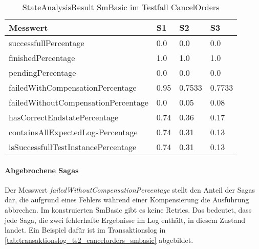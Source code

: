 \begin{center}
	\fontsize{9}{12}\selectfont
	\begin{longtable}[h]{|p{5cm}|p{1cm}|p{1cm}|p{1cm}|}
		\hline
		Messwert & S1 & S2 & S3 \\ \hline
		\endhead
		\caption{StateAnalysisResult SmBasic im Testfall CancelOrders}
		\label{tab:smbasic_stateanalysisresult_cancelorders}
		\endfoot
		successfull\-Percentage & 0.0 & 0.0 & 0.0 \\ \hline
		finished\-Percentage & 1.0 & 1.0 & 1.0 \\ \hline
		pending\-Percentage & 0.0 & 0.0 & 0.0 \\ \hline
		failedWithCompensation\-Percentage & 0.95 & 0.7533 & 0.7733 \\ \hline
		failedWithoutCompensation\-Percentage & 0.0 & 0.05 & 0.08 \\ \hline
		hasCorrectEndstate\-Percentage & 0.74 & 0.36 & 0.17 \\ \hline
		containsAllExpectedLogs\-Percentage & 0.74 & 0.31 & 0.13 \\ \hline
		isSuccessfullTestInstance\-Percentage & 0.74 & 0.31 & 0.13 \\ \hline
	\end{longtable}
\end{center}
\FloatBarrier

\paragraph*{Abgebrochene Sagas}
Der Messwert \textit{failedWithoutCompensationPercentage} stellt den Anteil der Sagas dar, die aufgrund eines Fehlers während einer Kompensierung die Ausführung abbrechen. Im konstruierten SmBasic gibt es keine Retries. Das bedeutet, dass jede Saga, die zwei fehlerhafte Ergebnisse im Log enthält, in diesem Zustand landet. Ein Beispiel dafür ist im Transaktionslog in \cref{tab:transaktionslog_ts2_cancelorders_smbasic} abgebildet. 

